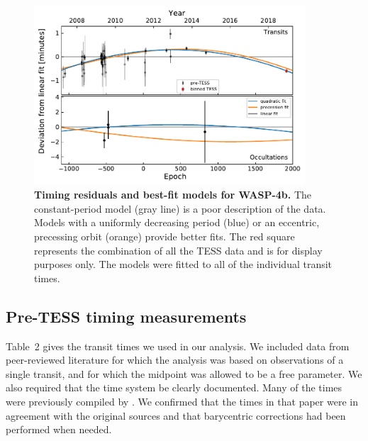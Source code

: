 \documentclass[12pt,twocolumn,tighten]{aastex62}
\begin{document}
{\begin{figure}[t]
	\begin{center}
		\leavevmode
		\includegraphics[width=0.9\textwidth]{f4.pdf}
	\end{center}
	\vspace{-0.7cm}
  \caption{ {\bf Timing residuals and best-fit models for WASP-4b.}
   The constant-period model (gray
  line) is a poor description of the data.  Models with a uniformly
  decreasing period (blue) or an eccentric, precessing orbit (orange)
  provide	better fits.  The red square
  represents the combination of all the TESS data and is for display
  purposes only.  The models were fitted to all of the individual
  transit times.
  \label{fig:times}
	}
\end{figure}


\subsection{Pre-TESS timing measurements}
\label{subsec:times}

Table~2 gives the transit times we used in our analysis. We included
data from peer-reviewed literature for which the analysis was based on
observations of a single transit, and for which
the midpoint was allowed to be a free parameter. We also required that
the time system be clearly documented. Many of the times were
previously compiled by \citet{hoyer_tramos_2013}. We confirmed that
the times in that paper were in agreement with the original sources
and that barycentric corrections had been performed when needed.

}
\end{document}
